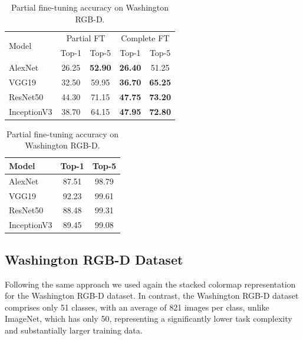\begin{table}[htbp]
    \centering
    \begin{minipage}[t]{0.48\textwidth}
        \centering
        \begin{tabular}{|l|c|c|c|c|}
            \hline
            \multirow{2}{*}{Model} & \multicolumn{2}{|c|}{Partial FT} & \multicolumn{2}{|c|}{Complete FT} \\ \cline{2-5}
             & Top-1 & Top-5 & Top-1 & Top-5 \\
            \hline
            AlexNet & 26.25 & \textbf{52.90} & \textbf{26.40} & 51.25 \\
            \hline
            VGG19 & 32.50 & 59.95 & \textbf{36.70} & \textbf{65.25} \\
            \hline
            ResNet50 & 44.30 & 71.15 & \textbf{47.75} & \textbf{73.20} \\
            \hline
            InceptionV3 & 38.70 & 64.15 & \textbf{47.95} & \textbf{72.80} \\
            \hline
        \end{tabular}
        \caption{Accuracy on 200-class ImageNet subset.}
        \label{tab:imagenet_subset_accuracy}
    \end{minipage}
    \hfill
    \begin{minipage}[t]{0.48\textwidth}
        \centering
        \begin{tabular}{|l|c|c|}
            \hline
            Model & Top-1 & Top-5 \\
            \hline
            AlexNet & 87.51 & 98.79 \\
            \hline
            VGG19 & 92.23 & 99.61 \\
            \hline
            ResNet50 & 88.48 & 99.31 \\
            \hline
            InceptionV3 & 89.45 & 99.08 \\
            \hline
        \end{tabular}
        \caption{Partial fine-tuning accuracy on Washington RGB-D.}
        \label{tab:washington_rgbd_accuracy}
    \end{minipage}
\end{table}

\subsection{Washington RGB-D Dataset}
Following the same approach we used again the stacked colormap representation for the Washington RGB-D dataset. In contrast, the Washington RGB-D dataset comprises only 51 classes, with an average of 821 images per class, unlike ImageNet, which has only 50, representing a significantly lower task complexity and substantially larger training data. 

